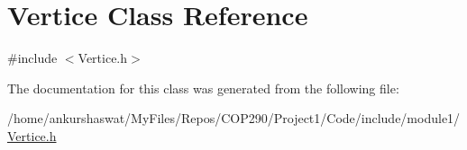 \hypertarget{classVertice}{}\section{Vertice Class Reference}
\label{classVertice}


{\ttfamily \#include $<$Vertice.\+h$>$}



The documentation for this class was generated from the following file\+:\begin{DoxyCompactItemize}
\item 
/home/ankurshaswat/\+My\+Files/\+Repos/\+C\+O\+P290/\+Project1/\+Code/include/module1/\hyperlink{Vertice_8h}{Vertice.\+h}\end{DoxyCompactItemize}
